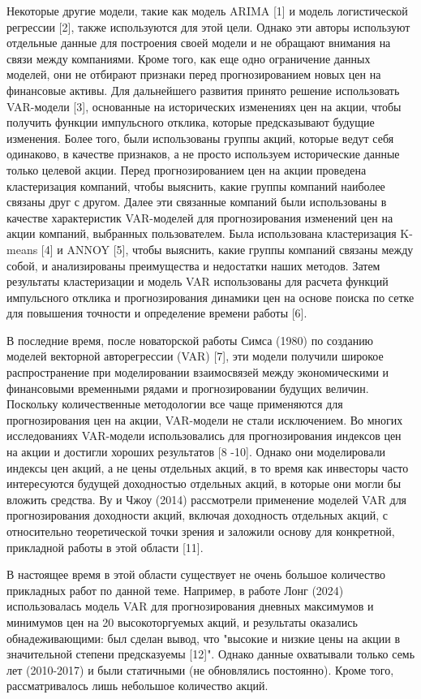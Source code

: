 \documentclass[
]{article}
\begin{document}
Некоторые другие модели, такие как модель ARIMA {[}1{]} и модель
логистической регрессии {[}2{]}, также используются для этой цели.
Однако эти авторы используют отдельные данные для построения своей
модели и не обращают внимания на связи между компаниями. Кроме того, как
еще одно ограничение данных моделей, они не отбирают признаки перед
прогнозированием новых цен на финансовые активы. Для дальнейшего
развития принято решение использовать VAR-модели {[}3{]}, основанные на
исторических изменениях цен на акции, чтобы получить функции импульсного
отклика, которые предсказывают будущие изменения. Более того, были
использованы группы акций, которые ведут себя одинаково, в качестве
признаков, а не просто используем исторические данные только целевой
акции. Перед прогнозированием цен на акции проведена кластеризация
компаний, чтобы выяснить, какие группы компаний наиболее связаны друг с
другом. Далее эти связанные компаний были использованы в качестве
характеристик VAR-моделей для прогнозирования изменений цен на акции
компаний, выбранных пользователем. Была использована кластеризация
K-means {[}4{]} и ANNOY {[}5{]}, чтобы выяснить, какие группы компаний
связаны между собой, и анализированы преимущества и недостатки наших
методов. Затем результаты кластеризации и модель VAR использованы для
расчета функций импульсного отклика и прогнозирования динамики цен на
основе поиска по сетке для повышения точности и определение времени
работы {[}6{]}.

В последние время, после новаторской работы Симса (1980) по созданию
моделей векторной авторегрессии (VAR) {[}7{]}, эти модели получили
широкое распространение при моделировании взаимосвязей между
экономическими и финансовыми временными рядами и прогнозировании будущих
величин. Поскольку количественные методологии все чаще применяются для
прогнозирования цен на акции, VAR-модели не стали исключением. Во многих
исследованиях VAR-модели использовались для прогнозирования индексов цен
на акции и достигли хороших результатов {[}8 -10{]}. Однако они
моделировали индексы цен акций, а не цены отдельных акций, в то время
как инвесторы часто интересуются будущей доходностью отдельных акций, в
которые они могли бы вложить средства. Ву и Чжоу (2014) рассмотрели
применение моделей VAR для прогнозирования доходности акций, включая
доходность отдельных акций, с относительно теоретической точки зрения и
заложили основу для конкретной, прикладной работы в этой области
{[}11{]}.

В настоящее время в этой области существует не очень большое количество
прикладных работ по данной теме. Например, в работе Лонг (2024)
использовалась модель VAR для прогнозирования дневных максимумов и
минимумов цен на 20 высокоторгуемых акций, и результаты оказались
обнадеживающими: был сделан вывод, что "высокие и низкие цены на акции в
значительной степени предсказуемы {[}12{]}". Однако данные охватывали
только семь лет (2010-2017) и были статичными (не обновлялись
постоянно). Кроме того, рассматривалось лишь небольшое количество акций.
\end{document}
